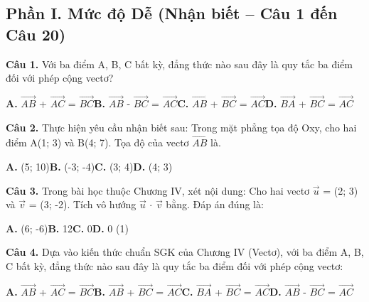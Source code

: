 \documentclass[11pt,a4paper]{article}
\begin{document}
\subsection*{\color{accent} Phần I. Mức độ Dễ (Nhận biết -- Câu 1 đến Câu 20)}
\textbf{\color{primary} Câu 1.} Với ba điểm A, B, C bất kỳ, đẳng thức nào sau đây là quy tắc ba điểm đối với phép cộng vectơ?\par
\hspace*{1.5em}\textbf{A.} $\overrightarrow{AB}$ + $\overrightarrow{AC}$ = $\overrightarrow{BC}$\quad\quad \textbf{B.} $\overrightarrow{AB}$ - $\overrightarrow{BC}$ = $\overrightarrow{AC}$\quad\quad \textbf{C.} $\overrightarrow{AB}$ + $\overrightarrow{BC}$ = $\overrightarrow{AC}$\quad\quad \textbf{D.} $\overrightarrow{BA}$ + $\overrightarrow{BC}$ = $\overrightarrow{AC}$\par\vspace{2pt}
\textbf{\color{primary} Câu 2.} Thực hiện yêu cầu nhận biết sau: Trong mặt phẳng tọa độ Oxy, cho hai điểm A(1; 3) và B(4; 7). Tọa độ của vectơ $\overrightarrow{AB}$ là.\par
\hspace*{1.5em}\textbf{A.} (5; 10)\quad\quad \textbf{B.} (-3; -4)\quad\quad \textbf{C.} (3; 4)\quad\quad \textbf{D.} (4; 3)\par\vspace{2pt}
\textbf{\color{primary} Câu 3.} Trong bài học thuộc Chương IV, xét nội dung: Cho hai vectơ $\vec{u}$ = (2; 3) và $\vec{v}$ = (3; -2). Tích vô hướng $\vec{u}$ $\cdot$ $\vec{v}$ bằng. Đáp án đúng là:\par
\hspace*{1.5em}\textbf{A.} (6; -6)\quad\quad \textbf{B.} 12\quad\quad \textbf{C.} 0\quad\quad \textbf{D.} 0 (1)\par\vspace{2pt}
\textbf{\color{primary} Câu 4.} Dựa vào kiến thức chuẩn SGK của Chương IV (Vectơ), với ba điểm A, B, C bất kỳ, đẳng thức nào sau đây là quy tắc ba điểm đối với phép cộng vectơ:\par
\hspace*{1.5em}\textbf{A.} $\overrightarrow{AB}$ + $\overrightarrow{AC}$ = $\overrightarrow{BC}$\quad\quad \textbf{B.} $\overrightarrow{AB}$ + $\overrightarrow{BC}$ = $\overrightarrow{AC}$\quad\quad \textbf{C.} $\overrightarrow{BA}$ + $\overrightarrow{BC}$ = $\overrightarrow{AC}$\quad\quad \textbf{D.} $\overrightarrow{AB}$ - $\overrightarrow{BC}$ = $\overrightarrow{AC}$\par\vspace{2pt}
\end{document}
